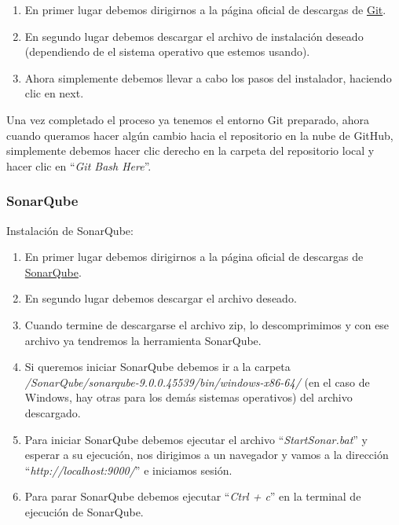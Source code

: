 \begin{enumerate}
\item
	En primer lugar debemos dirigirnos a la página oficial de descargas de \href{https://git-scm.com/downloads}{Git}.
\item
	En segundo lugar debemos descargar el archivo de instalación deseado (dependiendo de el sistema operativo que estemos usando).
\item 
	Ahora simplemente debemos llevar a cabo los pasos del instalador, haciendo clic en next.
\end{enumerate}
Una vez completado el proceso ya tenemos el entorno Git preparado, ahora cuando queramos hacer algún cambio hacia el repositorio en la nube de GitHub, simplemente debemos hacer clic derecho en la carpeta del repositorio local y hacer clic en ``\textit{Git Bash Here}''.

\subsubsection{SonarQube}\label{sonarQubeInstall}

Instalación de SonarQube:

\begin{enumerate}
\item
	En primer lugar debemos dirigirnos a la página oficial de descargas de \href{https://www.sonarqube.org/downloads/}{SonarQube}.
\item
	En segundo lugar debemos descargar el archivo deseado.
\item 
	Cuando termine de descargarse el archivo zip, lo descomprimimos y con ese archivo ya tendremos la herramienta SonarQube.
\item 
	Si queremos iniciar SonarQube debemos ir a la carpeta \textit{/SonarQube/sonarqube-9.0.0.45539/bin/windows-x86-64/} (en el caso de Windows, hay otras para los demás sistemas operativos) del archivo descargado.
\item
	Para iniciar SonarQube debemos ejecutar el archivo ``\textit{StartSonar.bat}'' y esperar a su ejecución, nos dirigimos a un navegador y vamos a la dirección ``\textit{http://localhost:9000/}'' e iniciamos sesión.
\item
	Para parar SonarQube debemos ejecutar ``\textit{Ctrl + c}'' en la terminal de ejecución de SonarQube.
\end{enumerate}

